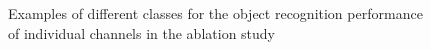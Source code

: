 \begin{figure}[h!]
\begin{tabular}{c|ccccccc}
\end{tabular}
\caption{Examples of different classes for the object recognition performance of individual channels in the ablation study}
\label{fig:ablation_example_pics}
\end{figure}




